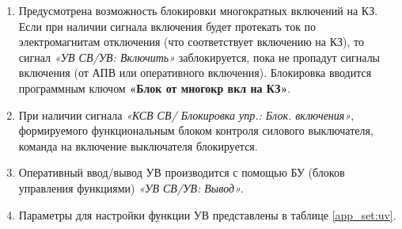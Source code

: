 \begin{enumerate}
\item
Предусмотрена возможность блокировки многократных включений на КЗ. Если при наличии сигнала
включения будет протекать ток по электромагнитам отключения (что соответствует включению на КЗ), то
сигнал \textit{«УВ СВ/УВ: Включить»} заблокируется, пока не пропадут сигналы включения (от АПВ или оперативного
включения). Блокировка вводится программным ключом \textbf{«Блок от многокр вкл на КЗ»}.

\item
При наличии сигнала \textit{«КСВ СВ/ Блокировка упр.: Блок. включения»}, формируемого функциональным блоком контроля силового
выключателя, команда на включение выключателя блокируется.

\item
Оперативный ввод/вывод УВ производится с помощью БУ (блоков управления функциями) \textit{«УВ СВ/УВ: Вывод»}. 

\item
Параметры для настройки функции УВ представлены в таблице \ref{app_set:uv}.

\end{enumerate}